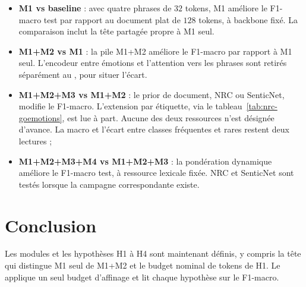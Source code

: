 \begin{itemize}
\item[\textbf{H1.}] \textbf{M1 vs baseline} : avec quatre phrases de $32$
  tokens, M1 améliore le F1-macro test par rapport au document plat de
  $128$ tokens, à backbone fixé. La comparaison inclut la tête partagée
  propre à M1 seul.
\item[\textbf{H2.}] \textbf{M1+M2 vs M1} : la pile M1+M2 améliore le
  F1-macro par rapport à M1 seul. L'encodeur entre émotions et l'attention
  vers les phrases sont retirés séparément au
  , pour situer l'écart.
\item[\textbf{H3.}] \textbf{M1+M2+M3 vs M1+M2} : le prior de document,
  NRC ou SenticNet, modifie le F1-macro. L'extension par étiquette, via
  le tableau~\ref{tab:nrc-goemotions}, est lue à part. Aucune des deux
  ressources n'est désignée d'avance. La macro et l'écart entre classes
  fréquentes et rares restent deux lectures ;
\item[\textbf{H4.}] \textbf{M1+M2+M3+M4 vs M1+M2+M3} : la pondération
  dynamique améliore le F1-macro test, à ressource lexicale fixée. NRC et
  SenticNet sont testés lorsque la campagne correspondante existe.
\end{itemize}

\section*{Conclusion}
Les modules et les hypothèses H1 à H4 sont maintenant définis, y compris
la tête qui distingue M1 seul de M1+M2 et le budget nominal de tokens
de H1. Le  applique un seul budget d'affinage
et lit chaque hypothèse sur le F1-macro.
